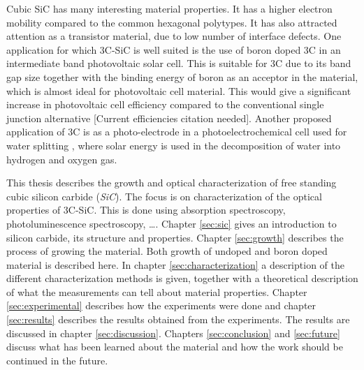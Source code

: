 Cubic SiC has many interesting material properties. It has a higher electron mobility compared to the common hexagonal polytypes. It has also attracted attention as a transistor material, due to low number of interface defects. One application for which 3C-SiC is well suited is the use of boron doped 3C in an intermediate band photovoltaic solar cell. This is suitable for 3C due to its band gap size together with the binding energy of boron as an acceptor in the material, which is almost ideal for photovoltaic cell material. This would give a significant increase in photovoltaic cell efficiency compared to the conventional single junction alternative \cite{Richards2003}[Current efficiencies citation needed]. Another proposed application of 3C is as a photo-electrode in a photoelectrochemical cell used for water splitting \cite{Kato2014,Yasuda2012}, where solar energy is used in the decomposition of water into hydrogen and oxygen gas. 

This thesis describes the growth and optical characterization of free standing cubic silicon carbide (\emph{SiC}).  The focus is on characterization of the optical properties of 3C-SiC. This is done using absorption spectroscopy, photoluminescence spectroscopy, \dots. Chapter \ref{sec:sic} gives an introduction to silicon carbide, its structure and properties. Chapter \ref{sec:growth} describes the process of growing the material. Both growth of undoped and boron doped material is described here. In chapter \ref{sec:characterization} a description of the different characterization methods is given, together with a theoretical description of what the measurements can tell about material properties. Chapter \ref{sec:experimental} describes how the experiments were done and chapter \ref{sec:results} describes the results obtained from the experiments. The results are discussed in chapter \ref{sec:discussion}. Chapters \ref{sec:conclusion} and \ref{sec:future} discuss what has been learned about the material and how the work should be continued in the future. 



































